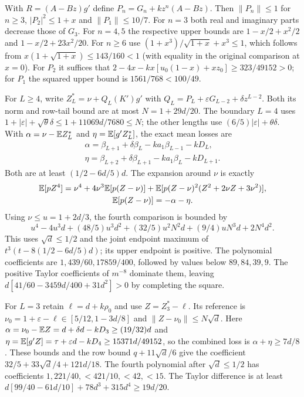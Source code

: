 With $R=(A-Bz)g'$ define $P_n=G_n+kz^n(A-Bz)$.
Then $\|P_n\|\le1$ for $n\ge3$, $|P_2|^2\le1+x$ and
$\|P_1\|\le10/7$.
For $n=3$ both real and imaginary parts decrease those of $G_3$.
For $n=4,5$ the respective upper bounds are
$1-x/2+x^2/2$ and $1-x/2+23x^2/20$.
For $n\ge6$ use
$(1+x^3)/\sqrt{1+x}+x^3\le1$, which follows from
$x(1+\sqrt{1+x})\le143/160<1$ (with equality in the original comparison at $x=0$).
For $P_2$ it suffices that
$2-4x-kx[u_0(1-x)+xz_0]\ge323/49152>0$;
for $P_1$ the squared upper bound is $1561/768<100/49$.

For $L\ge4$, write $Z_L^*=\nu+Q_L(K')g'$ with
$Q_L=P_L+\varepsilon G_{L-2}+\delta z^{L-2}$.
Both its norm and row-tail bound are at most $N=1+29d/20$.
The boundary $L=4$ uses
$1+|\varepsilon|+\sqrt\theta\delta\le1+11069d/7680\le N$;
the other lengths use $(6/5)|\varepsilon|+\theta\delta$.
With $\alpha=\nu-\mathbb E Z_L^*$ and $\eta=\mathbb E[g'Z_L^*]$, the exact mean losses are
\begin{gather*}
 \alpha=\beta_{L+1}+\delta\beta_L-ka_1\beta_{L-1}-kD_L,\\
 \eta=\beta_{L+2}+\delta\beta_{L+1}-ka_1\beta_L-kD_{L+1}.
\end{gather*}
Both are at least $(1/2-6d/5)d$.
The expansion around $\nu$ is exactly
\begin{gather*}
 \mathbb E[pZ^4]=\nu^4+4\nu^3\mathbb E[p(Z-\nu)]
   +\mathbb E[p(Z-\nu)^2(Z^2+2\nu Z+3\nu^2)],\\
 \mathbb E[p(Z-\nu)]=-\alpha-\eta.
\end{gather*}
Using $\nu\le u=1+2d/3$, the fourth comparison is bounded by
\[
 u^4-4u^3d+(48/5)u^3d^2+(32/5)u^2N^2d
                           +(9/4)uN^3d+2N^4d^2.
\]
This uses $\sqrt d\le1/2$ and the joint endpoint maximum of
$t^3(t-8(1/2-6d/5)d)$; its upper endpoint is positive.
The polynomial coefficients are $1,439/60,17859/400$, followed by
values below $89,84,39,9$.
The positive Taylor coefficients of $m^{-8}$ dominate them, leaving
$d[41/60-3459d/400+31d^2]>0$ by completing the square.

For $L=3$ retain $\ell=d+k\rho_0$ and use $Z=Z_3^*-\ell$.
Its reference is $\nu_0=1+\varepsilon-\ell\in[5/12,1-3d/8]$ and
$\|Z-\nu_0\|\le N\sqrt d$.
Here $\alpha=\nu_0-\mathbb E Z=d+\delta d-kD_3\ge(19/32)d$ and
$\eta=\mathbb E[g'Z]=\tau+\varepsilon d-kD_4\ge15371d/49152$,
so the combined loss is $\alpha+\eta\ge7d/8$. These bounds and the row bound $q+11\sqrt d/6$
give the coefficient $32/5+33\sqrt d/4+121d/18$.
The fourth polynomial after $\sqrt d\le1/2$ has coefficients
$1,221/40,<421/10,<42,<15$.
The Taylor difference is at least
$d[99/40-61d/10]+78d^3+315d^4\ge19d/20$.

